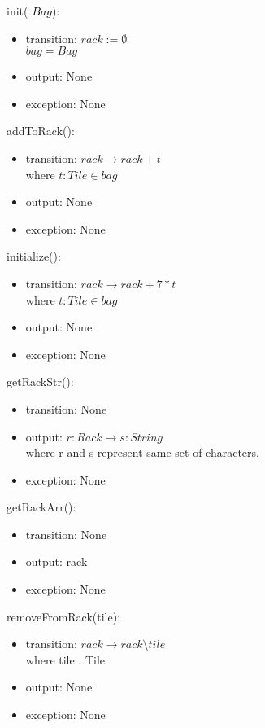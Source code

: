 \documentclass[12pt]{article}
\begin{document}
\noindent init(\textcolor{black}{ $Bag$}):
\begin{itemize}
\item transition: $rack := \emptyset $ \\
$bag = Bag$
\item output: None
\item exception: None
\end{itemize}

\noindent addToRack():
\begin{itemize}
\item transition: $rack \rightarrow rack + t$ \\
        where $t : Tile \in bag$
\item output: None
\item exception: None
\end{itemize}

\noindent initialize():
\begin{itemize}
\item transition: $rack \rightarrow rack + 7*t$ \\
        where $t : Tile \in bag$
\item output: None
\item exception: None
\end{itemize}

\newpage

\noindent getRackStr():
\begin{itemize}
\item transition: None
\item output: $r:Rack \rightarrow s:String$ \\
where r and s represent same set of characters.
\item exception: None
\end{itemize}

\noindent getRackArr():
\begin{itemize}
\item transition: None
\item output: rack
\item exception: None
\end{itemize}

\noindent removeFromRack(tile):
\begin{itemize}
\item transition: $rack \rightarrow rack \setminus tile$ \\
where tile : Tile
\item output: None
\item exception: None
\end{itemize}
\end{document}
